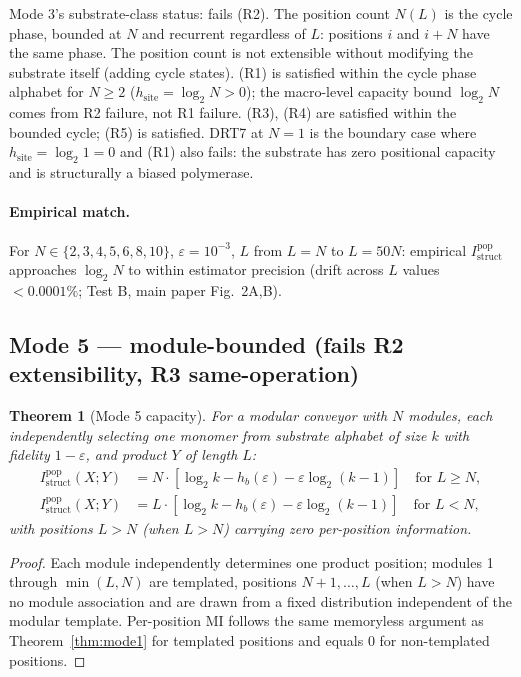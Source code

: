 \documentclass[11pt]{article}
\theoremstyle{plain}
\newtheorem{theorem}{Theorem}
\theoremstyle{definition}
\newcommand{\Istructpop}{I_{\mathrm{struct}}^{\mathrm{pop}}}
\newcommand{\Hbin}{h_b}
\begin{document}
Mode 3's substrate-class status: fails (R2). The position count $N(L)$ is the cycle phase, bounded at $N$ and recurrent regardless of $L$: positions $i$ and $i + N$ have the same phase. The position count is not extensible without modifying the substrate itself (adding cycle states). (R1) is satisfied within the cycle phase alphabet for $N \ge 2$ ($h_{\mathrm{site}} = \log_2 N > 0$); the macro-level capacity bound $\log_2 N$ comes from R2 failure, not R1 failure. (R3), (R4) are satisfied within the bounded cycle; (R5) is satisfied. DRT7 at $N=1$ is the boundary case where $h_{\mathrm{site}} = \log_2 1 = 0$ and (R1) also fails: the substrate has zero positional capacity and is structurally a biased polymerase.

\paragraph{Empirical match.} For $N \in \{2, 3, 4, 5, 6, 8, 10\}$, $\varepsilon = 10^{-3}$, $L$ from $L = N$ to $L = 50N$: empirical $\Istructpop$ approaches $\log_2 N$ to within estimator precision (drift across $L$ values $< 0.0001\%$; Test B, main paper Fig.~2A,B).

\subsection{Mode 5 --- module-bounded (fails R2 extensibility, R3 same-operation)}

\begin{theorem}[Mode 5 capacity]
\label{thm:mode5}
For a modular conveyor with $N$ modules, each independently selecting one monomer from substrate alphabet of size $k$ with fidelity $1 - \varepsilon$, and product $Y$ of length $L$:
\begin{align*}
\Istructpop(X; Y) &= N \cdot \left[\log_2 k - \Hbin(\varepsilon) - \varepsilon \log_2 (k - 1)\right] \quad \text{for } L \ge N, \\
\Istructpop(X; Y) &= L \cdot \left[\log_2 k - \Hbin(\varepsilon) - \varepsilon \log_2 (k - 1)\right] \quad \text{for } L < N,
\end{align*}
with positions $L > N$ (when $L > N$) carrying zero per-position information.
\end{theorem}

\begin{proof}
Each module independently determines one product position; modules 1 through $\min(L, N)$ are templated, positions $N+1, \ldots, L$ (when $L > N$) have no module association and are drawn from a fixed distribution independent of the modular template. Per-position MI follows the same memoryless argument as Theorem~\ref{thm:mode1} for templated positions and equals 0 for non-templated positions.
\end{proof}
\end{document}
